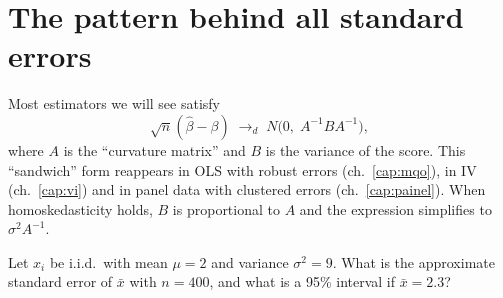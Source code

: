 \section{The pattern behind all standard errors}
Most estimators we will see satisfy
\[
\sqrt n(\hat\beta-\beta)\;\to_d\; N\!\big(0,\;A^{-1}BA^{-1}\big),
\]
where $A$ is the ``curvature matrix'' and $B$ is the variance of the score. This ``sandwich'' form reappears in OLS with robust errors (ch.~\ref{cap:mqo}), in IV (ch.~\ref{cap:vi}) and in panel data with clustered errors (ch.~\ref{cap:painel}). When homoskedasticity holds, $B$ is proportional to $A$ and the expression simplifies to $\sigma^2A^{-1}$.

\begin{exercicio}
Let $x_i$ be i.i.d.\ with mean $\mu=2$ and variance $\sigma^2=9$. What is the approximate standard error of $\bar x$ with $n=400$, and what is a 95\% interval if $\bar x=2.3$?
\end{exercicio}
